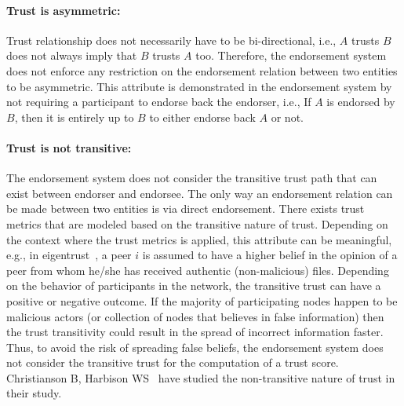 \paragraph{Trust is asymmetric:}Trust relationship does not necessarily have
to be bi-directional, i.e., $A$ trusts $B$ does not always imply that $B$
trusts $A$ too. Therefore, the endorsement system does not enforce any
restriction on the endorsement relation between two entities to be asymmetric.
This attribute is demonstrated in the endorsement system by not requiring a
participant to endorse back the endorser, i.e., If $A$ is endorsed by $B$, then
it is entirely up to $B$ to either endorse back $A$ or not.
\paragraph{Trust is not transitive:}The endorsement system does not consider
the transitive trust path that can exist between endorser and endorsee. The
only way an endorsement relation can be made between two entities is via direct
endorsement. There exists trust metrics that are modeled based on the
transitive nature of trust. Depending on the context where the trust metrics is
applied, this attribute can be meaningful, e.g., in
eigentrust~\cite{kamvar2003eigentrust}, a peer $i$ is assumed to have a higher
belief in the opinion of a peer from whom he/she has received authentic
(non-malicious) files. Depending on the behavior of participants in the
network, the transitive trust can have a positive or negative outcome. If the
majority of participating nodes happen to be malicious actors (or collection of
nodes that believes in false information) then the trust transitivity could
result in the spread of incorrect information faster.  Thus, to avoid the risk
of spreading false beliefs, the endorsement system does not consider the
transitive trust for the computation of a trust score.  Christianson B,
Harbison WS~\cite{christianson1996isn} have studied the non-transitive nature
of trust in their study. 
%
